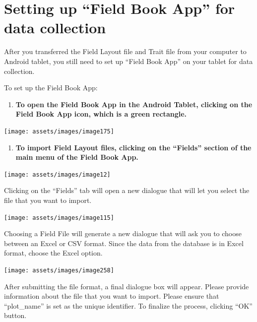 \documentclass[
  12pt,
]{book}
\providecommand{\tightlist}{%
  \setlength{\itemsep}{0pt}\setlength{\parskip}{0pt}}
\begin{document}
\hypertarget{setting-up-field-book-app-for-data-collection}{%
\section{Setting up ``Field Book App'' for data collection}\label{setting-up-field-book-app-for-data-collection}}

After you transferred the Field Layout file and Trait file from your computer to Android tablet, you still need to set up ``Field Book App'' on your tablet for data collection.

To set up the Field Book App:

\begin{enumerate}
\def\labelenumi{\arabic{enumi}.}
\tightlist
\item
  \textbf{To open the Field Book App in the Android Tablet, clicking on the Field Book App icon, which is a green rectangle.}
\end{enumerate}

\begin{center}\texttt{[image: assets/images/image175]} \end{center}

\begin{enumerate}
\def\labelenumi{\arabic{enumi}.}
\setcounter{enumi}{1}
\tightlist
\item
  \textbf{To import Field Layout files, clicking on the ``Fields'' section of the main menu of the Field Book App.}
\end{enumerate}

\begin{center}\texttt{[image: assets/images/image12]} \end{center}

Clicking on the ``Fields'' tab will open a new dialogue that will let you select the file that you want to import.

\begin{center}\texttt{[image: assets/images/image115]} \end{center}

Choosing a Field File will generate a new dialogue that will ask you to choose between an Excel or CSV format. Since the data from the database is in Excel format, choose the Excel option.

\begin{center}\texttt{[image: assets/images/image258]} \end{center}

After submitting the file format, a final dialogue box will appear. Please provide information about the file that you want to import. Please ensure that ``plot\_name'' is set as the unique identifier. To finalize the process, clicking ``OK'' button.
\end{document}
